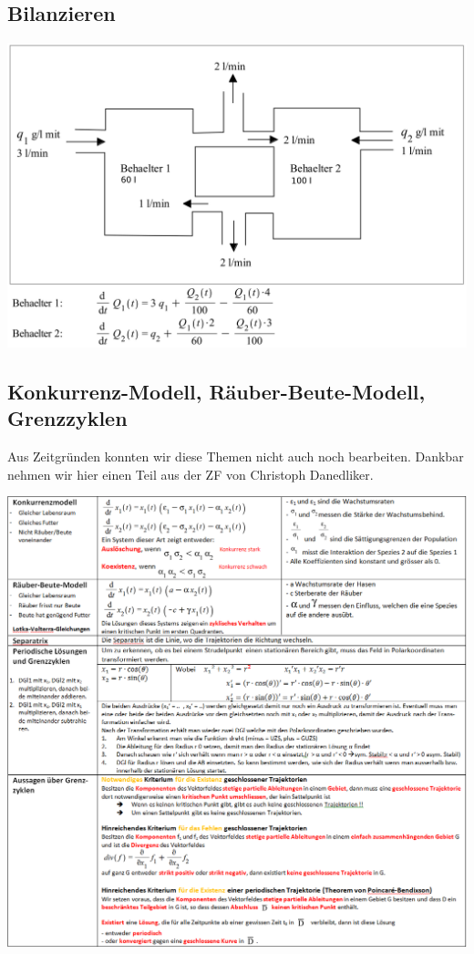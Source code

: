 \subsection{Bilanzieren}
\begin{minipage}[h]{0.7\textwidth}
	\includegraphics[width=1.0\textwidth]{images/Bilanzieren.png}
\end{minipage}

\subsection{Konkurrenz-Modell, Räuber-Beute-Modell, Grenzzyklen}
Aus Zeitgründen konnten wir diese Themen nicht auch noch bearbeiten. Dankbar nehmen wir hier einen Teil aus der ZF von Christoph Danedliker. \\
\begin{minipage}[h]{1\textwidth}
	\includegraphics[width=1.0\textwidth]{images/Rest.png}
\end{minipage}
